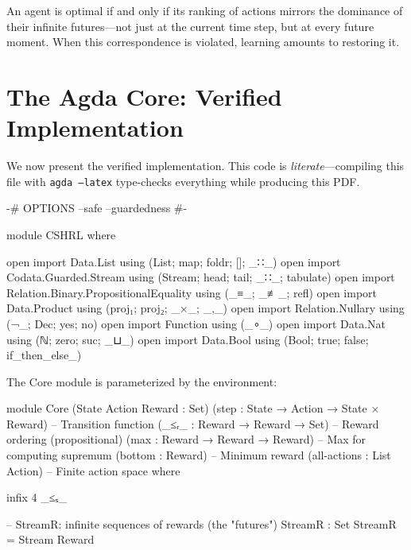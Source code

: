 \documentclass[9pt,a4paper]{article}
\theoremstyle{plain}
\theoremstyle{definition}
\theoremstyle{remark}
\begin{document}
\noindent An agent is optimal if and only if its ranking of actions mirrors the dominance of their infinite futures---not just at the current time step, but at every future moment.  When this correspondence is violated, learning amounts to restoring it.


\section{The Agda Core: Verified Implementation}

We now present the verified implementation. This code is \emph{literate}---compiling this file with \texttt{agda --latex} type-checks everything while producing this PDF.

\begin{code}
{-# OPTIONS --safe --guardedness #-}

module CSHRL where

open import Data.List using (List; map; foldr; []; _∷_)
open import Codata.Guarded.Stream using (Stream; head; tail; _∷_; tabulate)
open import Relation.Binary.PropositionalEquality using (_≡_; _≢_; refl)
open import Data.Product using (proj₁; proj₂; _×_; _,_)
open import Relation.Nullary using (¬_; Dec; yes; no)
open import Function using (_∘_)
open import Data.Nat using (ℕ; zero; suc; _⊔_)
open import Data.Bool using (Bool; true; false; if_then_else_)
\end{code}

The Core module is parameterized by the environment:

\begin{code}
module Core
  (State Action Reward : Set)
  (step                : State → Action → State × Reward)  -- Transition function
  (_≤ᵣ_                : Reward → Reward → Set)            -- Reward ordering (propositional)
  (max                 : Reward → Reward → Reward)         -- Max for computing supremum
  (bottom              : Reward)                           -- Minimum reward
  (all-actions         : List Action)                      -- Finite action space
  where

  infix 4 _≤ₛ_

  -- StreamR: infinite sequences of rewards (the "futures")
  StreamR : Set
  StreamR = Stream Reward
\end{code}
\end{document}
